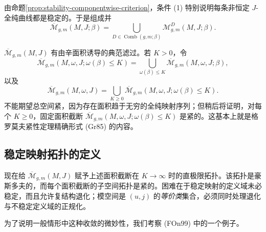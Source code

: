 由命题\ref{prop:stability-componentwise-criterion}，条件 (1) 特别说明每条非恒定
$J$-全纯曲线都是稳定的。于是组成并
\[
 \overline{\mathcal M}_{g,m}(M,J;\beta)
 =\bigcup_{D\in\operatorname{Comb}(g,m;\beta)}
 \mathcal M_{g,m}^D(M,J;\beta).
\]

\begin{remark}\label{rem:area-filtration-stable-map-moduli}
$\overline{\mathcal M}_{g,m}(M,J)$ 有由辛面积诱导的典范滤过。若 $K>0$，令
\[
 \overline{\mathcal M}_{g,m}(M,\omega,J;\omega(\beta)\le K)
 =\bigcup_{\omega(\beta)\le K}
 \overline{\mathcal M}_{g,m}(M,\omega,J;\beta),
\]
以及
\[
 \overline{\mathcal M}_{g,m}(M,\omega,J)
 =\bigcup_{K\ge0}\overline{\mathcal M}_{g,m}
 (M,\omega,J;\omega(\beta)\le K).
\]
不能期望总空间紧，因为存在面积趋于无穷的全纯映射序列；但稍后将证明，对每个
$K\ge0$，固定面积截断
$\overline{\mathcal M}_{g,m}(M,\omega,J;\omega(\beta)\le K)$
是紧的。这基本上就是格罗莫夫紧性定理精确形式 (Gr85) 的内容。
\end{remark}

\subsection{稳定映射拓扑的定义}
\label{subsec:definition-stable-map-topology}

现在给 $\overline{\mathcal M}_{g,m}(M,J)$ 赋予上述面积截断在
$K\to\infty$ 时的直极限拓扑。该拓扑是豪斯多夫的，而每个面积截断的子空间拓扑是紧的。困难在于稳定映射的定义域未必稳定，而且允许复结构退化；模空间是 $(u,j)$ 的\emph{等价类}集合，必须同时处理退化与不稳定定义域的正规化。

为了说明一般情形中这种收敛的微妙性，我们考察 (FOn99) 中的一个例子。

